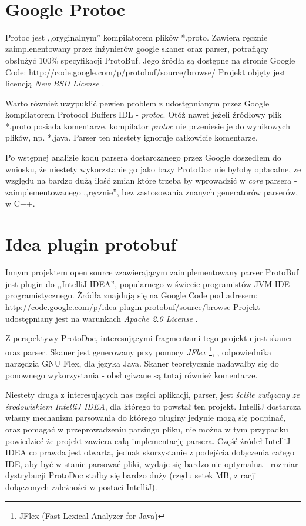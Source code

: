 \documentclass[pdflatex,11pt]{aghdpl}
\begin{document}
~\\\*

\section{Google Protoc}

Protoc jest ,,oryginalnym'' kompilatorem plików *.proto. Zawiera ręcznie zaimplenentowany przez inżynierów google skaner oraz parser,
potrafiący obsłużyć 100\% specyfikacji ProtoBuf. Jego źródła są dostępne na stronie Google Code: \href{http://code.google.com/p/protobuf/source/browse/}{http://code.google.com/p/protobuf/source/browse/}
Projekt objęty jest licencją \textit{New BSD License} \cite{BSDLicense}.

Warto również uwypuklić pewien problem z udostępnianym przez Google kompilatorem Protocol Buffers IDL - \textit{protoc}.
Otóź nawet jeżeli źródłowy plik *.proto posiada komentarze, kompilator \textit{protoc} nie przeniesie je do wynikowych plików, np. *.java.
Parser ten niestety ignoruje całkowicie komentarze. 

Po wstępnej analizie kodu parsera dostarczanego przez Google doszedłem do wniosku, 
że niestety wykorzstanie go jako bazy ProtoDoc nie byłoby opłacalne, ze względu na bardzo dużą ilość zmian które trzeba by wprowadzić w \textit{core} parsera
 - zaimplementowanego ,,ręcznie'', bez zastosowania znanych generatorów parserów, w C++.

\section{Idea plugin protobuf}

Innym projektem open source zzawierającym zaimplementowany parser ProtoBuf jest plugin do ,,IntelliJ IDEA'', popularnego w świecie programistów JVM 
IDE programistycznego. Źródła znajdują się na Google Code pod adresem: \href{http://code.google.com/p/idea-plugin-protobuf/source/browse}{http://code.google.com/p/idea-plugin-protobuf/source/browse}
Projekt udostępniany jest na warunkach \textit{Apache 2.0 License} \cite{ApacheLicense}.

Z perspektywy ProtoDoc, interesującymi fragmentami tego projektu jest skaner oraz parser. 
Skaner jest generowany przy pomocy \textit{JFlex} \footnote{JFlex (Fast Lexical Analyzer for Java)},
, odpowiednika narzędzia GNU Flex, dla języka Java. Skaner teoretycznie nadawałby się do ponownego wykorzystania - obsługiwane są tutaj również komentarze.

Niestety druga z interesujących nas części aplikacji, parser, jest \textit{ściśle związany ze środowiskiem IntelliJ IDEA}, dla którego to powstał ten projekt.
IntelliJ dostarcza własny mechanizm parsowania do którego pluginy jedynie mogą się podpinać, oraz pomagać w przeprowadzeniu parsingu pliku, nie można w tym przypadku
powiedzieć że projekt zawiera całą implementację parsera. Część źródeł IntelliJ IDEA co prawda jest otwarta, jednak skorzystanie z podejścia dołączenia całego IDE,
aby być w stanie parsować pliki, wydaje się bardzo nie optymalna - rozmiar dystrybucji ProtoDoc stałby się bardzo duży (rzędu setek MB, z racji dołączonych 
zależności w postaci IntelliJ).
\end{document}
